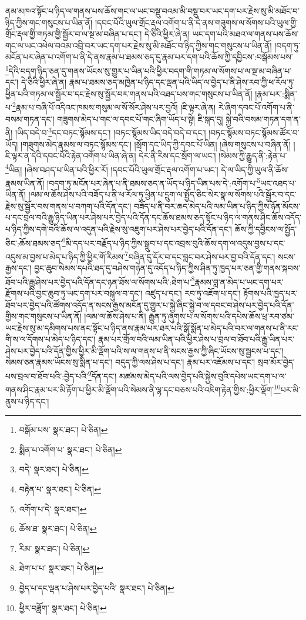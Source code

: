 ནམ་མཁའ་སྟོང་པ་ཉིད་ལ་གནས་པས་ཆོས་གང་ལ་ཡང་བསྡུ་བའམ་མི་བསྡུ་བར་ཡང་དག་པར་རྗེས་སུ་མི་མཐོང་བ་ཉིད་ཀྱིས་གང་གསུངས་པ་ཡིན་ནོ། །དབང་པོའི་ཡུལ་གྲོང་རྡལ་འགོག་པ་ནི་དེ་ནས་གཟུགས་ལ་སོགས་པའི་ཡུལ་གྱི་གྲོང་རྡལ་གྱི་གཏམ་གྱི་སྦྱོར་བ་ལ་སྔ་མ་བཞིན་པ་དང་། དེ་ཅིའི་ཕྱིར་ཞེ་ན། ཡང་དག་པའི་མཐའ་ལ་གནས་པས་ཆོས་གང་ལ་ཡང་འཕེལ་བའམ་འབྲི་བར་ཡང་དག་པར་རྗེས་སུ་མི་མཐོང་བ་ཉིད་ཀྱིས་གང་གསུངས་པ་ཡིན་ནོ། །བདག་ཏུ་མངོན་པར་ཞེན་པ་འགོག་པ་ནི་དེ་ནས་རྣམ་པ་ཐམས་ཅད་དུ་རྣམ་པར་དག་པའི་ཆོས་ཀྱི་དབྱིངས་:བསྒོམས་པས་\footnote{བསྒོམ་པས་  སྣར་ཐང་།  པེ་ཅིན། }དེའི་བདག་ཉིད་ཅན་དུ་གནས་ཡོངས་སུ་གྱུར་པ་ཡིན་པའི་ཕྱིར་བདག་གི་གཏམ་ལ་སོགས་པ་ལ་སྔ་མ་བཞིན་པ་དང་། དེ་ཅིའི་ཕྱིར་ཞེ་ན། རྣམ་པ་ཐམས་ཅད་མཁྱེན་པ་ཉིད་དང་ལྡན་པའི་ཡིད་ལ་བྱེད་པ་ནི་ཤེས་རབ་ཀྱི་ཕ་རོལ་ཏུ་ཕྱིན་པའི་གཏམ་ལ་སྦྱོར་བ་དང་རྗེས་སུ་སྦྱོར་བར་གནས་པའི་འཐད་པས་གང་གསུངས་པ་ཡིན་ནོ། །རྣམ་པར་:སྨིན་པ་\footnote{སྨིན་པ་འགོག་པ་  སྣར་ཐང་།  པེ་ཅིན། }རྣམ་པ་བཞི་པོ་འདིའང་ཁམས་གསུམ་ལ་སོ་སོར་ཤེས་པར་བྱའོ། །ཇི་ལྟར་ཞེ་ན། རེ་ཞིག་དབང་པོ་འགོག་པ་ནི་བསམ་གཏན་དང་། གཟུགས་མེད་པ་གང་ལ་དབང་པོ་གང་ཞིག་ཡོད་པ་སྟེ། ཇི་སྐད་དུ། སྐྱེ་བའི་བསམ་གཏན་དག་ན་ནི། །ཡིད་བདེ་བ་\footnote{བདེ་  སྣར་ཐང་།  པེ་ཅིན། }དང་བཏང་སྙོམས་དང་། །བཏང་སྙོམས་ཡིད་བདེ་བདེ་བ་དང་། །བཏང་སྙོམས་བཏང་སྙོམས་ཚོར་བ་ཡོད། །གཟུགས་མེད་རྣམས་ལ་བཏང་སྙོམས་དང་། །སྲོག་དང་ཡིད་ཀྱི་དབང་པོ་ཡིན། །ཞེས་གསུངས་པ་བཞིན་ནོ། །ཇི་ལྟར་ན་དེའི་དབང་པོའི་རྟེན་འགོག་པ་ཡིན་ཞེ་ན། དེར་ནི་རིས་དང་སྲོག་ལ་ཡང་། །སེམས་ཀྱི་རྒྱུད་ནི་:རྟེན་པ་\footnote{བརྟེན་པ་  སྣར་ཐང་།  པེ་ཅིན། }ཡིན། །ཞེས་བཤད་པ་ཡིན་པའི་ཕྱིར་རོ། །དབང་པོའི་ཡུལ་གྲོང་རྡལ་འགོག་པ་ཡང་། དེ་ལ་ཡིད་ཀྱི་ཡུལ་ནི་ཆོས་རྣམས་ཡིན་ནོ། །བདག་ཏུ་མངོན་པར་ཞེན་པ་ནི་ཐམས་ཅད་ན་ཡོད་པ་ཉིད་ཡིན་པས་དེ་:འགོག་པ་\footnote{འགོག་པ་དེ་  སྣར་ཐང་། }ཡང་འཐད་པ་ཡིན་ནོ། །ལམ་ལ་ཆོས་ཤེས་པའི་བཟོད་པ་ནི་ཕ་རོལ་ཏུ་ཕྱིན་པ་དྲུག་ལ་སྤྱོད་ཅིང་སེར་སྣ་ལ་སོགས་པའི་སྦྱོར་བ་དང་རྗེས་སུ་སྦྱོར་བས་གནས་པ་བཀག་པའི་དོན་དང་། བཟོད་པ་ནི་བར་ཆད་མེད་པའི་ལམ་ཡིན་པ་ཉིད་ཀྱིས་ཉོན་མོངས་པ་དང་བྲལ་བའི་རྒྱུ་ཉིད་ཡིན་པར་ཤེས་པར་བྱེད་པའི་དོན་དང་ཆོས་ཐམས་ཅད་སྟོང་པ་ཉིད་ལ་གནས་ཤིང་ཆོས་འདོད་པ་ཉིད་ཀྱིས་དགེ་བའི་ཆོས་ལ་འདུན་པའི་རྗེས་སུ་འཇུག་པར་ཤེས་པར་བྱེད་པའི་དོན་དང་། ཆོས་ཀྱི་དབྱིངས་ལ་སྤྱོད་ཅིང་:ཆོས་ཐམས་ཅད་\footnote{ཆོས་ཐ་  སྣར་ཐང་།  པེ་ཅིན། }མི་དད་པར་བརྗོད་པ་ཉིད་ཀྱིས་སྒྲུབ་པ་དང་འབྲས་བུའི་ཆོས་དག་ལ་འདུས་བྱས་པ་དང་འདུས་མ་བྱས་པ་མེད་པ་ཉིད་ཀྱི་ཕྱིར་གོ་རིམས་\footnote{རིམ་  སྣར་ཐང་།  པེ་ཅིན། }བཞིན་དུ་དོར་བ་དང་བླང་བར་ཤེས་པར་བྱ་བའི་དོན་དང་། སངས་རྒྱས་དང་། བྱང་ཆུབ་སེམས་དཔའི་ཐད་དུ་བཤེས་གཉེན་དུ་འདོད་པ་ཉིད་ཀྱིས་ཤིན་ཏུ་ཁྱད་པར་ཅན་གྱི་གནས་སྐབས་ཐོབ་པའི་རྒྱུ་ཤེས་པར་བྱེད་པའི་དོན་དང་ཉན་ཐོས་ལ་སོགས་པའི་:ཐེག་པ་\footnote{ཐེག་པ་པ་  སྣར་ཐང་།  པེ་ཅིན། }རྣམས་བླ་ན་མེད་པ་ཡང་དག་པར་རྫོགས་པའི་བྱང་ཆུབ་ཏུ་ཡང་དག་པར་བསྐུལ་བ་དང་། འཛུད་པ་དང་། རབ་ཏུ་འཇོག་པ་དང་། རྟོགས་པའི་ཁྱད་པར་ཐོབ་པར་བྱེད་པའི་ཚོགས་འདོད་ན་སངས་རྒྱས་མངོན་དུ་གྱུར་པ་སྐྱེ་ཞིང་སྐྱེ་བ་ལ་དབང་བ་ཤེས་པར་བྱེད་པའི་དོན་གྱིས་གང་གསུངས་པ་ཡིན་ནོ། །ལམ་ལ་ཆོས་ཤེས་པ་ནི། རྒྱུན་ཏུ་ཞུགས་པ་ལ་སོགས་པའི་དཔེས་ཆོས་ཕྲ་རབ་ཙམ་ཡང་རྗེས་སུ་མ་དམིགས་པས་ནང་སྟོང་པ་ཉིད་ནས་རྣམ་པར་ཐར་པའི་སྒོ་སྨོན་པ་མེད་པའི་བར་ལ་གནས་པ་ནི་རང་གི་ས་ལ་དོགས་པ་མེད་པ་ཉིད་དང་། རྣམ་པར་གྲོལ་བའི་ལམ་ཡིན་པའི་ཕྱིར་ཤེས་པ་བྲལ་བ་ཐོབ་པའི་རྒྱུ་ཡིན་པར་ཤེས་པར་བྱེད་པའི་དོན་གྱིས་ཕྱིར་མི་ལྡོག་པའི་ས་ལ་གནས་པ་ནི་སངས་རྒྱས་ཀྱི་ཞིང་ཡོངས་སུ་སྦྱངས་པ་དང་། སེམས་ཅན་རྣམས་ཡོངས་སུ་སྨིན་པ་དང་། བདུད་ཀྱི་ལས་ཤེས་པ་དང་། རྣམ་པར་འཇོམས་པ་དང་། སྲབ་མོར་བྱེད་པས་བྲལ་བ་ཐོབ་པའི་:བྱེད་པའི་\footnote{བྱེད་པ་དང་ལྡན་པ་ཤེས་པར་བྱེད་པའི་  སྣར་ཐང་།  པེ་ཅིན། }དོན་དང་། མཚམས་མེད་པའི་ལས་བྱེད་པའི་སྐྱེས་བུའི་དཔེས་ཡང་དག་པ་ལ་གནས་ཤིང་རྣམ་པར་མི་རྟོག་པ་ཕྱིར་མི་ལྡོག་པའི་སེམས་ནི་ལྷ་དང་བཅས་པའི་འཇིག་རྟེན་གྱིས་:ཕྱིར་ལྡོག་\footnote{ཕྱིར་བཟློག་  སྣར་ཐང་།  པེ་ཅིན། }པར་མི་ནུས་པ་ཉིད་དང་། 